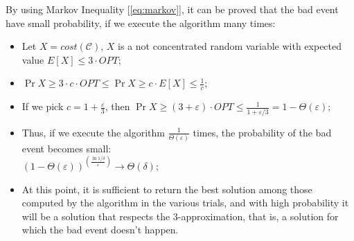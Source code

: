 \begin{obs}\label{obs:clust-4}
    By using Markov Inequality [\ref{eq:markov}], it can be proved that the bad event have small probability, if we execute the algorithm many times:
    \begin{itemize}
        \item Let $X=cost(\mathscr{C})$, $X$ is a not concentrated random variable with expected value $E[X] \leq 3 \cdot OPT$;
        \item $\Pr{X \geq 3 \cdot c \cdot OPT} \leq \Pr{X \geq c \cdot E[X]} \leq \frac{1}{c}$;
        \item If we pick $c=1+\frac{\varepsilon}{3}$, then $\Pr{X \geq (3 + \varepsilon) \cdot OPT} \leq \frac{1}{1 + \varepsilon / 3} = 1 - \Theta(\varepsilon)$;
        \item Thus, if we execute the algorithm $\frac{1}{\Theta(\varepsilon)}$ times, the probability of the bad event becomes small:\\
        $\left( 1 - \Theta(\varepsilon) \right)^{\left( \frac{\ln 1/\delta}{\varepsilon} \right)} \to \Theta(\delta)$;
        \item At this point, it is sufficient to return the best solution among those computed by the algorithm in the various trials, and with high probability it will be a solution that respects the 3-approximation, that is, a solution for which the bad event doesn't happen.
    \end{itemize}
\end{obs}

